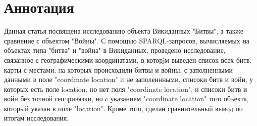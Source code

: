 \section{Аннотация}

Данная статья посвящена исследованию объекта Викиданных "Битвы", а также сравнение с объектом "Войны". С помощью SPARQL-запросов, вычисляемых на объектах типа "битва" и "война" в Викиданных, проведено исследование, связанное с географическими координатами, в которjм выведен список всех битв, карты с местами, на которых происходили битвы и войны, с заполненными данными в поле "coordinate location" и не заполеннными, списоки битв и войн, у которых есть поле location, но нет поля "coordinate location", и списоки битв и войн без точной геопривязки, но c указанием "coordinate location" того объекта, который указан в поле "location". Кроме того, сделан сравнительный вывод по итогам исследования.